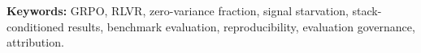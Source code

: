 \vspace{0.25in}
\noindent\textbf{Keywords:} GRPO, RLVR, zero-variance fraction, signal
starvation, stack-conditioned results, benchmark evaluation, reproducibility,
evaluation governance, attribution.

\tableofcontents
\listoffigures
\listoftables
